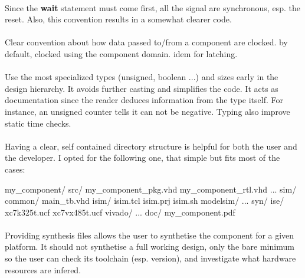 \documentclass[12pt]{article}
\begin{document}
\paragraph{}
Since the \textbf{wait} statement must come first, all the signal
are synchronous, esp. the reset. Also, this convention results in
a somewhat clearer code.



\paragraph{}
Clear convention about how data passed to/from a component are
clocked. by default, clocked using the component domain. idem for
latching.



\paragraph{}
Use the most specialized types (unsigned, boolean ...) and sizes
early in the design hierarchy. It avoids further casting and
simplifies the code. It acts as documentation since the reader
deduces information from the type itself. For instance, an
unsigned counter tells it can not be negative. Typing also
improve static time checks.



\paragraph{}
Having a clear, self contained directory structure is helpful
for both the user and the developer. I opted for the following
one, that simple but fits most of the cases:
\begin{sh}
my_component/
 src/
  my_component_pkg.vhd
  my_component_rtl.vhd
  ...
 sim/
  common/
   main_tb.vhd
  isim/
   isim.tcl
   isim.prj
   isim.sh
  modelsim/
   ...
 syn/
  ise/
   xc7k325t.ucf
   xc7vx485t.ucf
  vivado/
   ...
 doc/
  my_component.pdf
\end{sh}

\paragraph{}
Providing synthesis files allows the user to synthetise the
component for a given platform. It should not synthetise a full
working design, only the bare minimum so the user can check its
toolchain (esp. version), and investigate what hardware resources
are infered.
\end{document}

